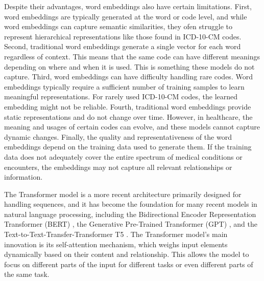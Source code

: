 \documentclass{bmcart}
\begin{document}
Despite their advantages, word embeddings also have certain 
limitations. First, word embeddings are typically generated at the word or 
code level, and while word embeddings can capture semantic similarities, they 
ofen struggle to represent hierarchical representations like those found in 
ICD-10-CM codes. Second, traditional word embeddings generate a single vector 
for each word regardless of context. This means that 
the same code can have different meanings depending on where and when it is 
used. This is something these models do not capture. Third, word embeddings 
can have difficulty handling rare codes. Word embeddings typically require 
a sufficient number of training samples to learn meaningful representations. 
For rarely used ICD-10-CM codes, the learned embedding might not be reliable. 
Fourth, traditional word embeddings provide static representations and do not change over time. However, in healthcare, the meaning and usages of certain codes can evolve, and these models cannot capture dynamic changes. 
Finally, the quality and representativeness of 
the word embeddings depend on the training data used to generate them. If the 
training data does not adequately cover the entire spectrum of medical 
conditions or encounters, the embeddings may not capture all relevant 
relationships or information.

The Transformer model \cite{vaswani2017} is a more recent architecture primarily designed for handling sequences, and it has become the foundation for many recent models in natural language processing, including the Bidirectional Encoder Representation
Transformer (BERT) \cite{devlin2018}, the Generative Pre-Trained Transformer (GPT) \cite{radford2018}, and the Text-to-Text-Transfer-Transformer T5 \cite{raffel2020}. The Transformer model's main innovation is its self-attention mechanism, which weighs input elements dynamically based on their content and relationship. This allows the model to focus on different parts of the input for different tasks or even different parts of the same task.
\end{document}
